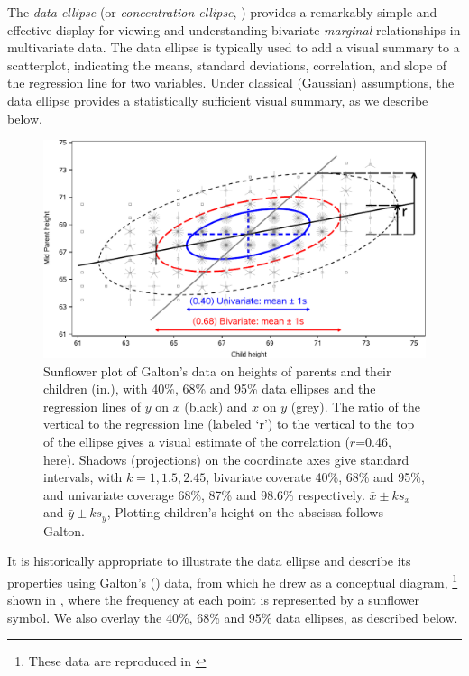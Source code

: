 
The \emph{data ellipse} \citep{Monette:90} (or \emph{concentration ellipse}, \citealp[Ch. 7]{Dempster:69})
provides a remarkably
simple and effective display for viewing and understanding
bivariate \emph{marginal} relationships in multivariate data.
The data ellipse is typically used to add a visual summary to a scatterplot,
indicating the means, standard deviations, correlation,
and slope of the regression line for
two variables. Under classical (Gaussian) assumptions, the data ellipse
provides a statistically sufficient visual summary, as we describe below.


\begin{figure}[htb]
  \centering
  \includegraphics[width=.9\textwidth,clip]{fig/galton-reg3}
  \caption{Sunflower plot of Galton's data on heights of parents and their children (in.), with
  40\%, 68\% and 95\% data ellipses and the regression lines of $y$ on $x$ (black) and
  $x$ on $y$ (grey). The ratio of the vertical to the regression line (labeled `r') to the vertical
  to the top of the ellipse gives a visual estimate of the correlation ($r$=0.46, here).
  Shadows (projections) on the coordinate axes give standard intervals, with $k=1, 1.5, 2.45$,
  bivariate coverate 40\%, 68\% and 95\%, and univariate coverage 68\%, 87\% and 98.6\% respectively.
  $\bar{x} \pm k s_x$ and $\bar{y} \pm k s_y$, 
  Plotting children's height on the abscissa follows Galton.
  }%
  \label{fig:galton-reg3}
\end{figure}

It is historically appropriate to illustrate the data ellipse and
describe its properties using Galton's (\citeyear[Table
I]{Galton:1886})
data, from which he drew  as a conceptual
diagram,%
\footnote{These data are reproduced in \citet[Table 8.2, p.
286]{Stigler:1986}}
shown in , where the frequency at
each point is represented by a sunflower symbol. We also overlay the 40\%,
68\% and 95\% data ellipses, as described below.

